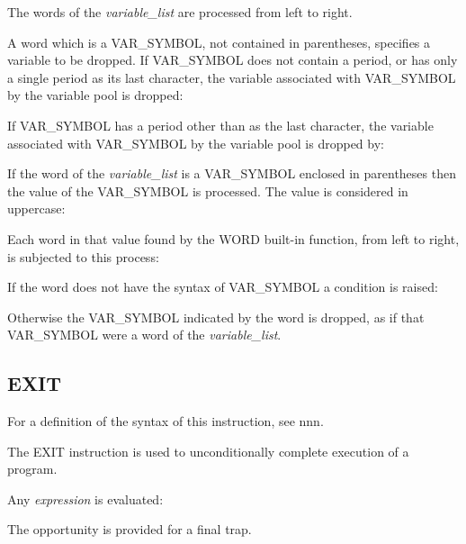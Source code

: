 The words of the \emph{variable\_list} are processed from left to right.

A word which is a VAR\_SYMBOL, not contained in parentheses, specifies a
variable to be dropped. If VAR\_SYMBOL does not contain a period, or has
only a single period as its last character, the variable associated with
VAR\_SYMBOL by the variable pool is dropped:



If VAR\_SYMBOL has a period other than as the last character, the
variable associated with VAR\_SYMBOL by the variable pool is dropped by:



If the word of the \emph{variable\_list} is a VAR\_SYMBOL enclosed in
parentheses then the value of the VAR\_SYMBOL is processed. The value is
considered in uppercase:



Each word in that value found by the WORD built-in function, from left
to right, is subjected to this process:

If the word does not have the syntax of VAR\_SYMBOL a condition is
raised:



Otherwise the VAR\_SYMBOL indicated by the word is dropped, as if that
VAR\_SYMBOL were a word of the \emph{variable\_list}.

\subsection{EXIT}\label{exit}

For a definition of the syntax of this instruction, see nnn.

The EXIT instruction is used to unconditionally complete execution of a
program.

Any \emph{expression} is evaluated:



The opportunity is provided for a final trap.



